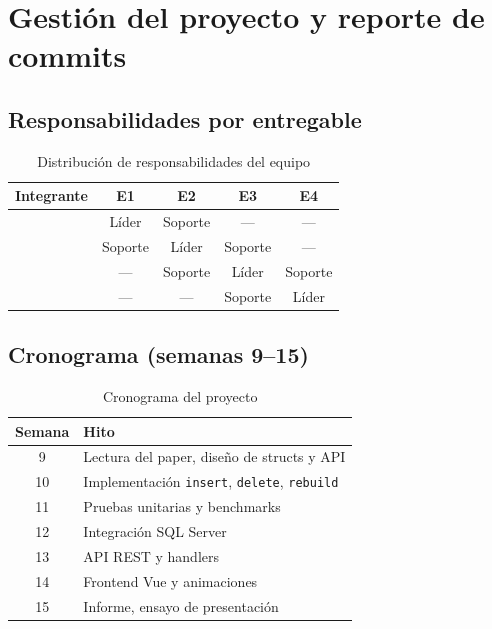 \chapter{Gestión del proyecto y reporte de commits}

\section{Responsabilidades por entregable}

\begin{table}[H]
  \centering
  \caption{Distribución de responsabilidades del equipo}
  \begin{tabular}{@{}lcccc@{}}
    \toprule
    \textbf{Integrante} & \textbf{E1} & \textbf{E2} & \textbf{E3} & \textbf{E4} \\
    \midrule
    [Integrante 1] & Líder & Soporte & --- & --- \\
    [Integrante 2] & Soporte & Líder & Soporte & --- \\
    [Integrante 3] & --- & Soporte & Líder & Soporte \\
    [Integrante 4] & --- & --- & Soporte & Líder \\
    \bottomrule
  \end{tabular}
\end{table}

\section{Cronograma (semanas 9--15)}

\begin{table}[H]
  \centering
  \caption{Cronograma del proyecto}
  \begin{tabular}{@{}cl@{}}
    \toprule
    \textbf{Semana} & \textbf{Hito} \\
    \midrule
    9 & Lectura del paper, diseño de structs y API \\
    10 & Implementación \texttt{insert}, \texttt{delete}, \texttt{rebuild} \\
    11 & Pruebas unitarias y benchmarks \\
    12 & Integración SQL Server \\
    13 & API REST y handlers \\
    14 & Frontend Vue y animaciones \\
    15 & Informe, ensayo de presentación \\
    \bottomrule
  \end{tabular}
\end{table}

